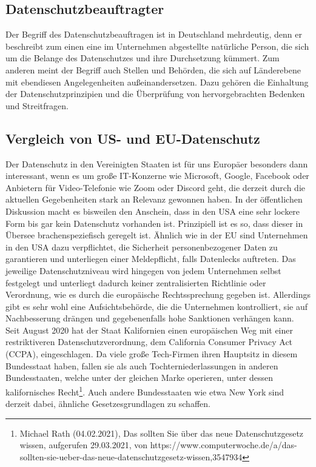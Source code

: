 \subsection{Datenschutzbeauftragter}
    Der Begriff des Datenschutzbeauftragen ist in Deutschland mehrdeutig, denn er beschreibt zum einen eine im Unternehmen abgestellte natürliche Person, die sich um die Belange des Datenschutzes und ihre Durchsetzung kümmert. Zum anderen meint der Begriff auch Stellen und Behörden, die sich auf Länderebene mit ebendiesen Angelegenheiten außeinandersetzen. Dazu gehören die Einhaltung der Datenschutzprinzipien und die Überprüfung von hervorgebrachten Bedenken und Streitfragen.

\subsection{Vergleich von US- und EU-Datenschutz}
    Der Datenschutz in den Vereinigten Staaten ist für uns Europäer besonders dann interessant, wenn es um große IT-Konzerne wie Microsoft, Google, Facebook oder Anbietern für Video-Telefonie wie Zoom oder Discord geht, die derzeit durch die aktuellen Gegebenheiten stark an Relevanz gewonnen haben. In der öffentlichen Diskussion macht es bisweilen den Anschein, dass in den USA eine sehr lockere Form bis gar kein Datenschutz vorhanden ist. Prinzipiell ist es so, dass dieser in Übersee brachenspeziefisch geregelt ist. Ähnlich wie in der EU sind Unternehmen in den USA dazu verpflichtet, die Sicherheit personenbezogener Daten zu garantieren und unterliegen einer Meldepflicht, falls Datenlecks auftreten. Das jeweilige Datenschutzniveau wird hingegen von jedem Unternehmen selbst festgelegt und unterliegt dadurch keiner zentralisierten Richtlinie oder Verordnung, wie es durch die europäische Rechtssprechung gegeben ist. Allerdings gibt es sehr wohl eine Aufsichtsbehörde, die die Unternehmen kontrolliert, sie auf Nachbesserung drängen und gegebenenfalls hohe Sanktionen verhängen kann.\\
    Seit August 2020 hat der Staat Kalifornien einen \glqq europäischen Weg\grqq{} mit einer restriktiveren Datenschutzverordnung, dem California Consumer Privacy Act (CCPA), eingeschlagen. Da viele große Tech-Firmen ihren Hauptsitz in diesem Bundesstaat haben, fallen sie als auch Tochterniederlassungen in anderen Bundesstaaten, welche unter der gleichen Marke operieren, unter dessen kalifornisches Recht\footnote{Michael Rath (04.02.2021), Das sollten Sie über das neue Datenschutzgesetz wissen, aufgerufen 29.03.2021, von https://www.computerwoche.de/a/das-sollten-sie-ueber-das-neue-datenschutzgesetz-wissen,3547934}. Auch andere Bundesstaaten wie etwa New York sind derzeit dabei, ähnliche Gesetzesgrundlagen zu schaffen.\\
